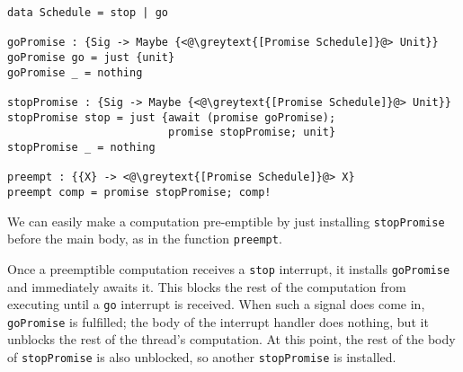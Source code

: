 \documentclass[msc,deptreport,cs]{infthesis} %
\newcommand{\code}[1]{\lstinline{#1}}
\newcommand{\greytext}[1]{\textcolor{black!40}{#1}}
\begin{document}
\begin{lstlisting}
data Schedule = stop | go

goPromise : {Sig -> Maybe {<@\greytext{[Promise Schedule]}@> Unit}}
goPromise go = just {unit}
goPromise _ = nothing

stopPromise : {Sig -> Maybe {<@\greytext{[Promise Schedule]}@> Unit}}
stopPromise stop = just {await (promise goPromise);
                         promise stopPromise; unit}
stopPromise _ = nothing

preempt : {{X} -> <@\greytext{[Promise Schedule]}@> X}
preempt comp = promise stopPromise; comp!
\end{lstlisting}

\noindent We can easily make a computation pre-emptible by just installing
\code{stopPromise} before the main body, as in the function \code{preempt}.

Once a preemptible computation receives a \code{stop} interrupt, it installs
\code{goPromise} and immediately awaits it. This blocks the rest of the
computation from executing until a \code{go} interrupt is received. When such a
signal does come in, \code{goPromise} is fulfilled; the body of the interrupt
handler does nothing, but it unblocks the rest of the thread's computation. At
this point, the rest of the body of \code{stopPromise} is also unblocked, so
another \code{stopPromise} is installed.





\end{document}
